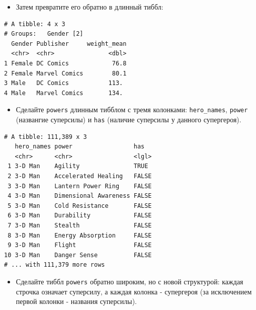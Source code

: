 \documentclass[
]{book}
\providecommand{\tightlist}{%
  \setlength{\itemsep}{0pt}\setlength{\parskip}{0pt}}
\begin{document}
\begin{itemize}
\tightlist
\item
  Затем превратите его обратно в длинный тиббл:
\end{itemize}

\begin{verbatim}
# A tibble: 4 x 3
# Groups:   Gender [2]
  Gender Publisher     weight_mean
  <chr>  <chr>               <dbl>
1 Female DC Comics            76.8
2 Female Marvel Comics        80.1
3 Male   DC Comics           113. 
4 Male   Marvel Comics       134. 
\end{verbatim}

\begin{itemize}
\tightlist
\item
  Сделайте \texttt{powers} длинным тибблом с тремя колонками: \texttt{hero\_names}, \texttt{power} (названгие суперсилы) и \texttt{has} (наличие суперсилы у данного супергероя).
\end{itemize}

\begin{verbatim}
# A tibble: 111,389 x 3
   hero_names power                 has  
   <chr>      <chr>                 <lgl>
 1 3-D Man    Agility               TRUE 
 2 3-D Man    Accelerated Healing   FALSE
 3 3-D Man    Lantern Power Ring    FALSE
 4 3-D Man    Dimensional Awareness FALSE
 5 3-D Man    Cold Resistance       FALSE
 6 3-D Man    Durability            FALSE
 7 3-D Man    Stealth               FALSE
 8 3-D Man    Energy Absorption     FALSE
 9 3-D Man    Flight                FALSE
10 3-D Man    Danger Sense          FALSE
# ... with 111,379 more rows
\end{verbatim}

\begin{itemize}
\tightlist
\item
  Сделайте тиббл \texttt{powers} обратно широким, но с новой структурой: каждая строчка означает суперсилу, а каждая колонка - супергероя (за исключением первой колонки - названия суперсилы).
\end{itemize}
\end{document}
